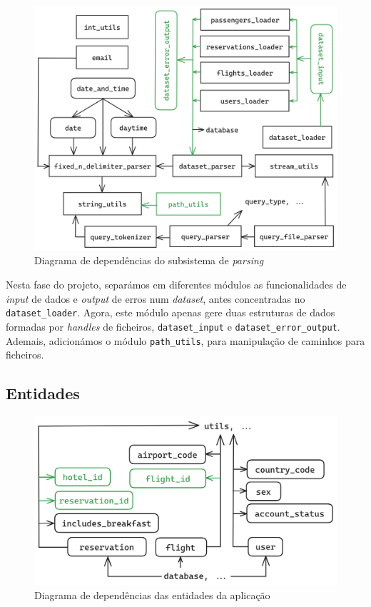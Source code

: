 \documentclass[11pt, a4paper]{article}
\begin{document}
\begin{figure}[ht]
    \centering
    \includegraphics[scale=0.16]{res-fase2/parsing.png}
    \caption{Diagrama de dependências do subsistema de \emph{parsing}}
    \label{fig:parsing}
\end{figure}

Nesta fase do projeto, separámos em diferentes módulos as funcionalidades de \emph{input} de dados
e \emph{output} de erros num \emph{dataset}, antes concentradas no \texttt{dataset\_loader}. Agora,
este módulo apenas gere duas estruturas de dados formadas por \emph{handles} de ficheiros,
\texttt{dataset\_input} e \texttt{dataset\_error\_output}. Ademais, adicionámos o módulo
\texttt{path\_utils}, para manipulação de caminhos para ficheiros.

\subsection{Entidades}
\label{sec:entities}

\begin{figure}[H]
    \centering
    \includegraphics[scale=0.16]{res-fase2/entities.png}
    \caption{Diagrama de dependências das entidades da aplicação}
    \label{fig:entities}
\end{figure}
\end{document}
